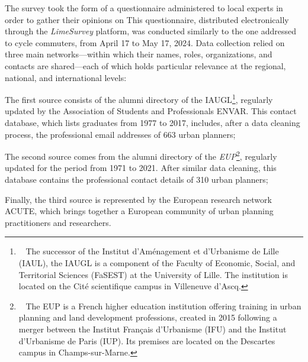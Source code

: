 \begin{refsegment}
The survey took the form of a questionnaire administered to local experts in order to gather their opinions on  This questionnaire, distributed electronically through the \textsl{LimeSurvey} platform, was conducted similarly to the one addressed to cycle commuters, from April 17 to May 17, 2024. Data collection relied on three main networks—within which their names, roles, organizations, and contacts are shared—each of which holds particular relevance at the regional, national, and international levels:
\begin{customitemize}
    \item The first source consists of the alumni directory of the \acrfull{IAUGL}\footnote{~
        The successor of the Institut d'Aménagement et d'Urbanisme de Lille (IAUL), the \acrfull{IAUGL} is a component of the Faculty of Economic, Social, and Territorial Sciences (FaSEST) at the University of Lille. The institution is located on the Cité scientifique campus in Villeneuve d'Ascq.
    }, regularly updated by the Association of Students and Professionals \acrfull{ENVAR}. This contact database, which lists graduates from 1977 to 2017, includes, after a data cleaning process, the professional email addresses of 663 urban planners;
    \item The second source comes from the alumni directory of the \textsl{EUP}\footnote{~
        The \acrfull{EUP} is a French higher education institution offering training in urban planning and land development professions, created in 2015 following a merger between the Institut Français d'Urbanisme (IFU) and the Institut d'Urbanisme de Paris (IUP). Its premises are located on the Descartes campus in Champs-sur-Marne.
    }, regularly updated for the period from 1971 to 2021. After similar data cleaning, this database contains the professional contact details of 310 urban planners;
    \item Finally, the third source is represented by the European research network \acrfull{ACUTE}, which brings together a European community of urban planning practitioners and researchers.
\end{customitemize}%


\end{refsegment}
